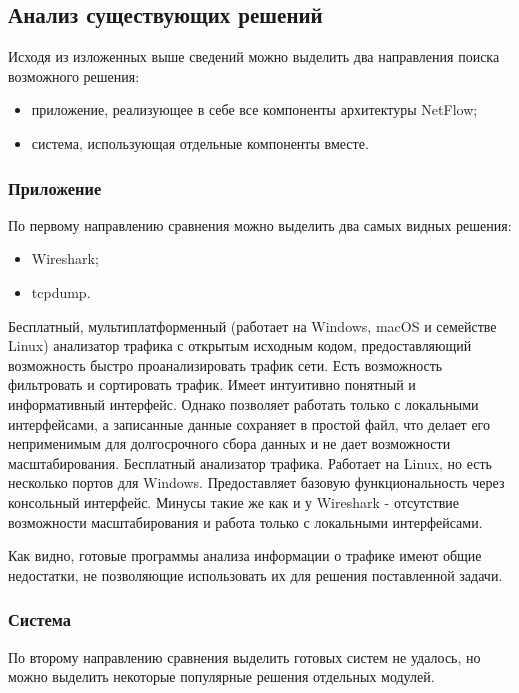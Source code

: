 \subsection{ Анализ существующих решений}
Исходя из изложенных выше сведений можно выделить два направления поиска возможного решения:
\begin{itemize}
	\item приложение, реализующее в себе все компоненты архитектуры NetFlow;
	\item система, использующая отдельные компоненты вместе.
\end{itemize}

\subsubsection{ Приложение }
По первому направлению сравнения можно выделить два самых видных решения:
\begin{itemize}
	\item Wireshark;
	\item tcpdump.
\end{itemize}

Бесплатный, мультиплатформенный (работает на Windows, macOS и семействе Linux) анализатор трафика с открытым исходным кодом, предоставляющий возможность быстро проанализировать трафик сети\cite{wireshark}. Есть возможность фильтровать и сортировать трафик. Имеет интуитивно понятный и информативный интерфейс. Однако позволяет работать только с локальными интерфейсами, а записанные данные сохраняет в простой файл, что делает его неприменимым для долгосрочного сбора данных и не дает возможности масштабирования.
Бесплатный анализатор трафика\cite{tcpdump}. Работает на Linux, но есть несколько портов для Windows. Предоставляет базовую функциональность через консольный интерфейс. Минусы такие же как и у Wireshark - отсутствие возможности масштабирования и работа только с локальными интерфейсами.

Как видно, готовые программы анализа информации о трафике имеют общие недостатки, не позволяющие использовать их для решения поставленной задачи.
\subsubsection{ Система }
По второму направлению сравнения выделить готовых систем не удалось, но можно выделить некоторые популярные решения отдельных модулей.


